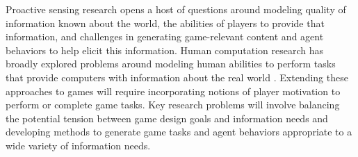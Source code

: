 \documentclass[conference]{IEEEtran}
\begin{document}
Proactive sensing research opens a host of questions around modeling quality of information known about the world, the abilities of players to provide that information, and challenges in generating game-relevant content and agent behaviors to help elicit this information. 
Human computation research has broadly explored problems around modeling human abilities to perform tasks that provide computers with information about the real world \cite{law2011:hcomp-book}. 
Extending these approaches to games will require incorporating notions of player motivation to perform or complete game tasks.
Key research problems will involve balancing the potential tension between game design goals and information needs and developing methods to generate game tasks and agent behaviors appropriate to a wide variety of information needs.




\end{document}
